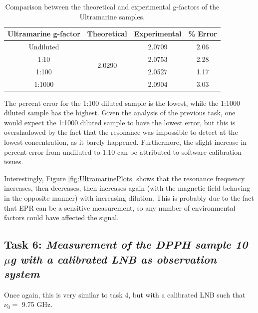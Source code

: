 \documentclass{article}
\begin{document}
\begin{table}[h]
	\centering
	\begin{tabular}{|c|c|c|c|}
	\hline
	Ultramarine g-factor & Theoretical             & Experimental & \% Error \\ \hline
	Undiluted            & \multirow{4}{*}{2.0290} & 2.0709       & 2.06     \\ \cline{1-1} \cline{3-4} 
	1:10                 &                         & 2.0753       & 2.28     \\ \cline{1-1} \cline{3-4} 
	1:100                &                         & 2.0527       & 1.17     \\ \cline{1-1} \cline{3-4} 
	1:1000               &                         & 2.0904       & 3.03     \\ \hline
	\end{tabular}
	\caption{Comparison between the theoretical and experimental g-factors of the Ultramarine samples.}
\end{table}

The percent error for the 1:100 diluted sample is the lowest, while the 1:1000 diluted sample has the highest. Given the analysis of the previous task, one would expect the 1:1000 diluted sample to have the lowest error, but this is overshadowed by the fact that
the resonance was impossible to detect at the lowest concentration, as it barely happened. Furthermore, the slight increase in percent error from undiluted to 1:10 can be attributed to software calibration issues. 

Interestingly, Figure \ref{fig:UltramarinePlots} shows that the resonance frequency increases, then decreases, then increases again (with the magnetic field behaving in the opposite manner) with increasing dilution. This is probably due to the fact that EPR can be a sensitive measurement, so any number of environmental factors could have affected the signal. 

\pagebreak{}

\subsection{Task 6: \textit{Measurement of the DPPH sample 10 $\mu$g with a calibrated LNB as observation
system}}

Once again, this is very similar to task 4, but with a calibrated LNB such that $\nu_0 =$ 9.75 GHz. 
\end{document}
